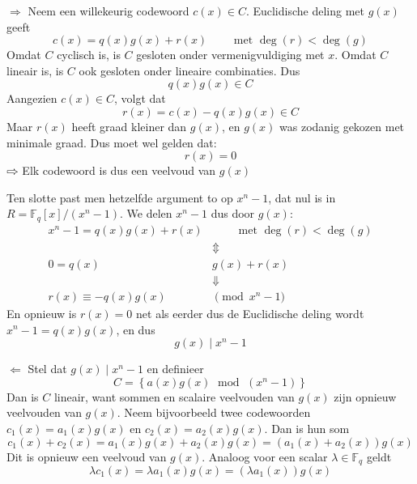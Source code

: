 $\boxed{\Rightarrow}$ Neem een willekeurig codewoord $c(x) \in C$. Euclidische deling met $g(x)$ geeft
\begin{equation*}
    c(x) = q(x)g(x) + r(x) \qquad \text{ met } \deg(r) < \deg(g)
\end{equation*}
Omdat $C$ cyclisch is, is $C$ gesloten onder vermenigvuldiging met $x$. Omdat $C$ lineair is, is $C$ ook gesloten onder lineaire combinaties. Dus
\begin{equation*}
    q(x)g(x) \in C
\end{equation*}
Aangezien $c(x) \in C$, volgt dat
\begin{equation*}
    r(x) = c(x) - q(x)g(x) \in C
\end{equation*}
Maar $r(x)$ heeft graad kleiner dan $g(x)$, en $g(x)$ was zodanig gekozen met minimale graad. Dus moet wel gelden dat:
\begin{equation*}
    r(x) = 0
\end{equation*}
$\rightwhitearrow$ Elk codewoord is dus een veelvoud van $g(x)$

Ten slotte past men hetzelfde argument to op $x^n-1$, dat nul is in $R = \mathbb{F}_q\left[x\right] / (x^n-1)$. We delen $x^n-1$ dus door $g(x)$:
\begin{equation*}
    \begin{aligned}
        x^n-1 = q(x)g(x) + r(x) &\qquad \text{ met } \deg(r) < \deg(g) \\
        &\Updownarrow \\
        0 = q(x)&g(x) + r(x) \\
        &\Downarrow \\
        r(x) \equiv -q(x)g(x) &\pmod {x^n-1}
    \end{aligned}
\end{equation*}
En opnieuw is $r(x)=0$ net als eerder dus de Euclidische deling wordt $x^n-1 = q(x)g(x)$, en dus
\begin{equation*}
    g(x) \mid x^n-1
\end{equation*}

$\boxed{\Leftarrow}$ Stel dat $g(x) \mid x^n-1$ en definieer
\begin{equation*}
    C = \left\{ a(x)g(x) \;\text{ mod }\; (x^n-1) \right\}
\end{equation*}
Dan is $C$ lineair, want sommen en scalaire veelvouden van $g(x)$ zijn opnieuw veelvouden van $g(x)$. Neem bijvoorbeeld twee codewoorden $c_1(x) = a_1(x)g(x)$ en $c_2(x) = a_2(x)g(x)$. Dan is hun som
\begin{equation*}
    c_1(x) + c_2(x) = a_1(x)g(x) + a_2(x)g(x) = \left(a_1(x) + a_2(x)\right)g(x)
\end{equation*}
Dit is opnieuw een veelvoud van $g(x)$. Analoog voor een scalar $\lambda \in \mathbb{F}_q$ geldt
\begin{equation*}
    \lambda c_1(x) = \lambda a_1(x)g(x) = \left(\lambda a_1(x)\right)g(x)
\end{equation*}

